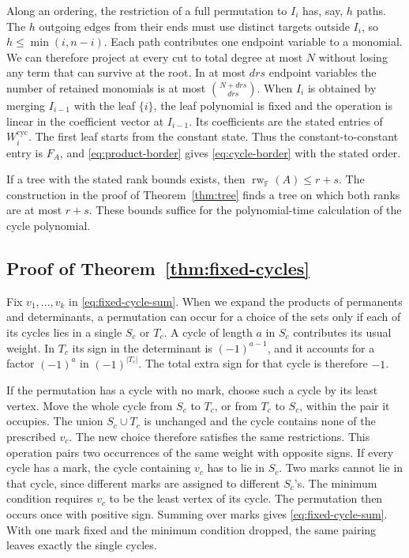\documentclass[11pt,reqno]{amsart}
\theoremstyle{remark}
\numberwithin{equation}{section}
\newcommand{\F}{\mathbb F}
\begin{document}
Along an ordering, the restriction of a full permutation to \(I_i\) has,
say, \(h\) paths. The \(h\) outgoing edges from their ends must use
distinct targets outside \(I_i\), so \(h\leq\min(i,n-i)\). Each path
contributes one endpoint variable to a monomial. We can therefore project
at every cut to total degree at most \(N\) without losing any term that
can survive at the root. In at most \(drs\) endpoint variables the number
of retained monomials is at most \(\binom{N+drs}{drs}\). When \(I_i\) is
obtained by merging \(I_{i-1}\) with the leaf \(\{i\}\), the leaf
polynomial is fixed and the operation is linear in the coefficient vector
at \(I_{i-1}\). Its coefficients are the stated entries of
\(W_i^{\mathrm{cyc}}\). The first leaf starts from the constant state.
Thus the constant-to-constant entry is \(F_A\), and
\eqref{eq:product-border} gives \eqref{eq:cycle-border} with the stated
order.

If a tree with the stated rank bounds exists, then
\(\operatorname{rw}_{\F}(A)\le r+s\). The construction in the proof of
Theorem~\ref{thm:tree} finds a tree on which both ranks are at most
\(r+s\). These bounds suffice for the polynomial-time calculation
of the cycle polynomial.

\subsection{Proof of Theorem~\ref{thm:fixed-cycles}}

Fix \(v_1,\ldots,v_k\) in \eqref{eq:fixed-cycle-sum}. When we expand the
products of permanents and determinants, a permutation can occur for a
choice of the sets only if each of its cycles lies in a single \(S_c\) or
\(T_c\). A cycle of length \(a\) in \(S_c\) contributes its usual weight.
In \(T_c\) its sign in the determinant is \((-1)^{a-1}\), and it accounts
for a factor \((-1)^a\) in \((-1)^{|T_c|}\). The total extra sign for
that cycle is therefore \(-1\).

If the permutation has a cycle with no mark, choose such a cycle by its
least vertex. Move the whole cycle from \(S_c\) to \(T_c\), or from
\(T_c\) to \(S_c\), within the pair it occupies. The union \(S_c\cup
T_c\) is unchanged and the cycle contains none of the prescribed \(v_c\).
The new choice therefore satisfies the same restrictions. This operation
pairs two occurrences of the same weight with opposite signs. If every
cycle has a mark, the cycle containing \(v_c\) has to lie in \(S_c\). Two
marks cannot lie in that cycle, since different marks are assigned to
different \(S_c\)'s. The minimum condition requires \(v_c\) to be the
least vertex of its cycle. The permutation then occurs once with positive
sign. Summing over marks gives \eqref{eq:fixed-cycle-sum}. With one mark
fixed and the minimum condition dropped, the same pairing leaves exactly
the single cycles.
\end{document}
